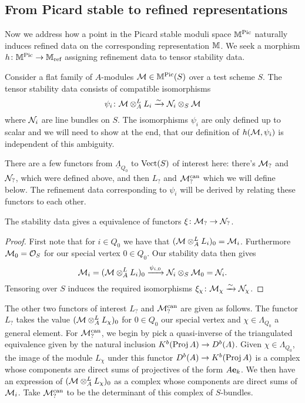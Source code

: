 \documentclass[12pt]{amsart}
\begin{document}
\subsection{From Picard stable to refined representations}
Now we address how a point in the Picard stable moduli space $\mathbb{M}^{\operatorname{Pic}}$ naturally induces refined data on the corresponding representation $\mathbb{M}$.
We seek a morphism $h \colon \mathbb{M}^{\operatorname{Pic}} \to \mathbb{M}_{\text{ref}}$ assigning refinement data to tensor stability data.

Consider a flat family of $A$-modules $\mathcal{M} \in \mathbb{M}^{\operatorname{Pic}}(S)$ over a test scheme $S$.
The tensor stability data consists of compatible isomorphisms 
$$\psi_i \colon \mathcal{M} \otimes_A^L L_i \xrightarrow{\sim} \mathcal{N}_i \otimes_S \mathcal{M}$$
where $\mathcal{N}_i$ are line bundles on $S$. 
The isomorphisms $\psi_i$ are only defined up to scalar and we will need to show at the end, that our definition of $h(\mathcal{M},\psi_i)$ is independent of this ambiguity.

There are a few functors from $\underline{\Lambda}_{Q_0}$ to $\operatorname{Vect}(S)$ of interest here: there's $\mathcal{M}_?$ and $\mathcal{N}_?$, which were defined above, and then $L_?$ and $\mathcal{M}_?^{\text{can}}$ which we will define below.
The refinement data corresponding to $\psi_i$ will be derived by relating these functors to each other.

\begin{lemma}\label{lm:equivNM}
The stability data gives a equivalence of functors  $\xi \colon \mathcal{M}_? \rightarrow \mathcal{N}_?$.
\end{lemma}

\begin{proof}
First note that for $i\in Q_0$ we have that $(\mathcal{M} \otimes_A^L L_i)_0 = \mathcal{M}_i$.
Furthermore $\mathcal{M}_0 = \mathcal{O}_S$ for our special vertex $0\in Q_0$.
Our stability data then gives
$$\mathcal{M}_i = (\mathcal{M} \otimes_A^L L_i)_0 \xrightarrow{\psi_{i,0}} \mathcal{N}_i \otimes_S \mathcal{M}_0 = \mathcal{N}_i.$$
Tensoring over $S$ induces the required isomorphisms $\xi_\chi \colon \mathcal{M}_\chi \xrightarrow{\sim} \mathcal{N}_\chi$.
\end{proof}

The other two functors of interest $L_?$ and $\mathcal{M}_?^{\text{can}}$ are given as follows.
The functor $L_?$ takes the value  $(\mathcal{M} \otimes_A^L L_\chi)_0$ for $0 \in Q_0$ our special vertex and $\chi \in \Lambda_{Q_0}$ a general element.
For $\mathcal{M}_?^{\text{can}}$, we begin by pick a quasi-inverse of the triangulated equivalence given by the natural inclusion $K^b(\operatorname{Proj} A) \rightarrow D^b(A)$.
Given $\chi \in \Lambda_{Q_0}$, the image of the module $L_\chi$ under this functor $D^b(A) \rightarrow K^b(\operatorname{Proj} A)$ is a complex whose components are direct sums of projectives of the form $A\mathbf{e}_k$.
We then have an expression of $(\mathcal{M} \otimes_A^L L_\chi)_0$ as a complex whose components are direct sums of $\mathcal{M}_i$.
Take $\mathcal{M}_?^{\text{can}}$ to be the determinant of this complex of $S$-bundles.
\end{document}
